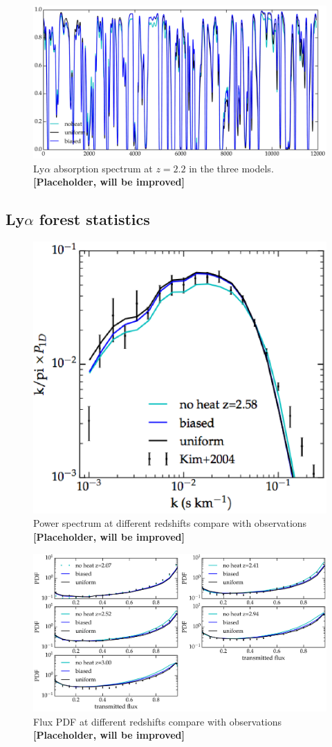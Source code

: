 \documentclass[numberedappendix]{emulateapj}
\newcommand\ALc[1]{{\color{red} \bf #1}} %
\begin{document}
\begin{figure}[h]
\centering
\includegraphics[width = .8\textwidth ]{lines_z2_2}
\caption{Ly$\alpha$ absorption spectrum at $z=2.2$ in the three models. \ALc{[Placeholder, will be improved]}}
\label{fig:bias}
\end{figure}

\subsection{Ly$\alpha$ forest statistics}


\begin{figure}[h]
\centering
\includegraphics[width = .45\textwidth ]{powerspec}
\caption{ Power spectrum at different redshifts compare with observations \ALc{[Placeholder, will be improved]}}
\label{fig:powespec}
\end{figure}

\begin{figure}[h]
\centering
\includegraphics[width = .9\textwidth ]{flux_PDF}
\caption{Flux PDF at different redshifts compare with observations \ALc{[Placeholder, will be improved]}}
\label{fig:fluxPDF}
\end{figure}
\end{document}
